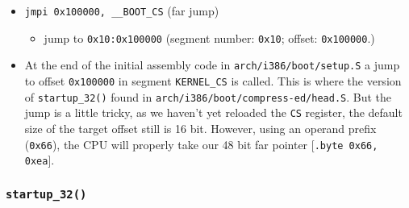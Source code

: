 \begin{enumerate}
  \begin{itemize}
  \item \texttt{jmpi 0x100000, __BOOT_CS} (far jump)
    \begin{itemize}
    \item jump to \texttt{0x10:0x100000} (segment number: \texttt{0x10}; offset:
      \texttt{0x100000}.)
    \end{itemize}
  \item At the end of the initial assembly code in \texttt{arch/i386/boot/setup.S} a jump
    to offset \texttt{0x100000} in segment \texttt{KERNEL\_CS} is called. This is where
    the version of \texttt{startup_32()} found in
    \texttt{arch/i386/boot/compress-ed/head.S}. But the jump is a little tricky, as we
    haven't yet reloaded the \texttt{CS} register, the default size of the target offset
    still is 16 bit. However, using an operand prefix (\texttt{0x66}), the CPU will
    properly take our 48 bit far pointer [\texttt{.byte 0x66, 0xea}]. 
  \end{itemize}
\end{enumerate}



\subsubsection{\texttt{startup\_32()}}

